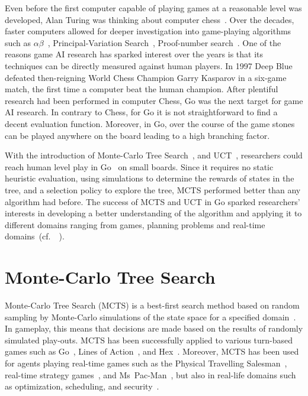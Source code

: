 \documentclass{kecsmstr}
\newcommand{\cf}{{cf.}~}
\begin{document}
Even before the first computer capable of playing games at a reasonable level was developed, Alan Turing was thinking about computer chess~. Over the decades, faster computers allowed for deeper investigation into game-playing algorithms such as $\alpha\beta$~, Principal-Variation Search~, Proof-number search~. One of the reasons game AI research has sparked interest over the years is that its techniques can be directly measured against human players. In 1997 {\sc Deep Blue}~ defeated then-reigning World Chess Champion Garry Kasparov in a six-game match, the first time a computer beat the human champion. After plentiful research had been performed in computer Chess, Go was the next target for game AI research. In contrary to Chess, for Go it is not straightforward to find a decent evaluation function. Moreover, in Go, over the course of the game stones can be played anywhere on the board leading to a high branching factor.

With the introduction of Monte-Carlo Tree Search~, and UCT~, researchers could reach human level play in Go~ on small boards. Since it requires no static heuristic evaluation, using simulations to determine the rewards of states in the tree, and a selection policy to explore the tree, MCTS performed better than any algorithm had before. The success of MCTS and UCT in Go sparked researchers' interests in developing a better understanding of the algorithm and applying it to different domains ranging from games, planning problems and real-time domains~(\cf~).
\newpage
\section{Monte-Carlo Tree Search}
Monte-Carlo Tree Search (MCTS) is a best-first search method based on random sampling by Monte-Carlo simulations of the state space for a specified domain~. In gameplay, this means that decisions are made based on the results of randomly simulated play-outs. MCTS has been successfully applied to various turn-based games such as Go~, Lines of Action~, and Hex~. Moreover, MCTS has been used for agents playing real-time games such as the Physical Travelling Salesman~, real-time strategy games~, and Ms~Pac-Man~, but also in real-life domains such as optimization, scheduling, and security~.
\end{document}
